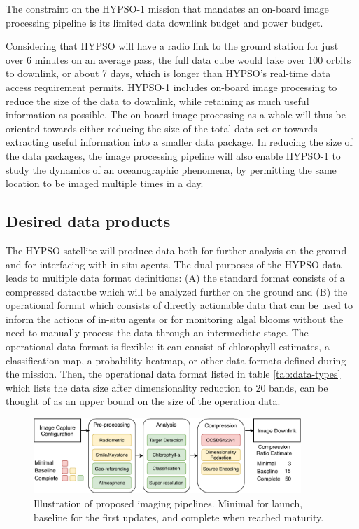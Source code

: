 The constraint on the HYPSO-1 mission that mandates an on-board image processing pipeline is its limited data downlink budget and power budget. 

Considering that HYPSO will have a radio link to the ground station for just over 6 minutes on an average pass, the full data cube would take over 100 orbits to downlink, or about 7 days, which is longer than HYPSO's real-time data access requirement permits. 
HYPSO-1 includes on-board image processing to reduce the size of the data to downlink, while retaining as much useful information as possible. The on-board image processing as a whole will thus be oriented towards either reducing the size of the total data set or towards extracting useful information into a smaller data package. 
In reducing the size of the data packages, the image processing pipeline will also enable HYPSO-1 to study the dynamics of an oceanographic phenomena, by permitting the same location to be imaged multiple times in a day. 
\subsection{Desired data products}

The HYPSO satellite will produce data both for further analysis on the ground and for interfacing with in-situ agents. 
The dual purposes of the HYPSO data leads to multiple data format definitions: (A) the standard format consists of a compressed datacube which will be analyzed further on the ground and (B) the operational format which consists of directly actionable data that can be used to inform the actions of in-situ agents or for monitoring algal blooms without the need to manually process the data through an intermediate stage. 
The operational data format is flexible: it can consist of chlorophyll estimates, a classification map, a probability heatmap, or other data formats defined during the mission. 
Then, the operational data format listed in table \ref{tab:data-types} which lists the data size after dimensionality reduction to 20 bands, can be thought of as an upper bound on the size of the operation data.


\begin{figure}
    \centering
    \includegraphics[width = 0.9\textwidth]{figs/img_processing/pipeline_figure_concept_paper.pdf}
    \caption{Illustration of proposed imaging pipelines. Minimal for launch, baseline for the first updates, and complete when reached maturity.}
    \label{fig:image-processing-pipelines}
\end{figure}

